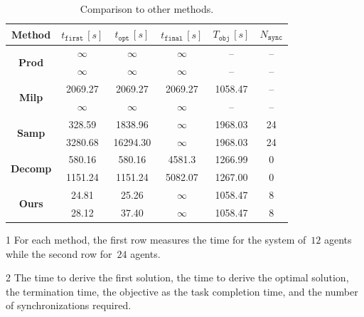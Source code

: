 \begin{table}[t]
  \centering
  \begin{threeparttable}
	\caption{Comparison to other methods.}
	\label{table:compare}
	\begin{tabular}{|c|c|c|c|c|c|}\hline
	  \tnote{1} Method & \tnote{2} $t_{\texttt{first}}\, [s]$
          & \tnote{2} $t_{\texttt{opt}}\, [s]$
	  & \tnote{2} $t_{\texttt{final}}\,[s]$ & \tnote{2} $T_{\texttt{obj}}\,[s]$
          & \tnote{2} $N_{\texttt{sync}}$ \\[0.5ex] \hline
		\multirow{2}{*}{\textbf{Prod}}& $\infty$ & $\infty$ & $\infty$ & -- & -- \\[0.5ex]
                 & $\infty$ & $\infty$ & $\infty$ & -- & -- \\[0.5ex]
                \hline
		\multirow{2}{*}{\textbf{Milp}} & 2069.27 & 2069.27 & 2069.27 & 1058.47 & -- \\[0.5ex]
                &$\infty$ &$\infty$ & $\infty$ & -- & --  \\[0.5ex]
                \hline
		\multirow{2}{*}{\textbf{Samp}} & 328.59 & 1838.96 & $\infty$ & 1968.03 & 24 \\[0.5ex]
                 & 3280.68 &  16294.30 & $\infty$ & 1968.03 & 24 \\[0.5ex]
                \hline
		\multirow{2}{*}{\textbf{Decomp}} & 580.16 & 580.16 & 4581.3 & 1266.99 & 0 \\[0.5ex]
		 & 1151.24 & 1151.24 & 5082.07 & 1267.00 & 0 \\[0.5ex]
                \hline
		\multirow{2}{*}{\textbf{Ours}} & 24.81 & 25.26 & $\infty$ & 1058.47 & 8 \\[0.5ex]
                 & 28.12 & 37.40 & $\infty$ & 1058.47 & 8 \\[0.5ex]
		\hline
	\end{tabular}
  \begin{tablenotes}
  \item[1] For each method, the first row measures the time for the
    system of~$12$ agents while the second row for~$24$ agents.
  \item[2] The time to derive the first solution,
    the time to derive the optimal solution,
    the termination time, the objective as the task completion time,
and the number of synchronizations required.
  \end{tablenotes}
   \end{threeparttable}
\end{table}


